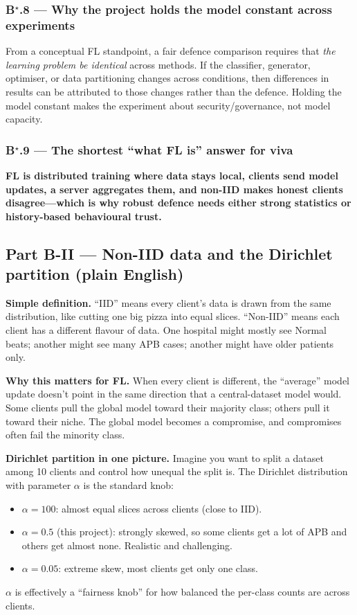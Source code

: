 \documentclass[11pt,a4paper]{article}
\begin{document}
\subsubsection{B$^\star$.8 --- Why the project holds the model constant across experiments}
From a conceptual FL standpoint, a fair defence comparison requires that
\emph{the learning problem be identical} across methods. If the classifier,
generator, optimiser, or data partitioning changes across conditions, then
differences in results can be attributed to those changes rather than the defence.
Holding the model constant makes the experiment about security/governance, not
model capacity.

\subsubsection{B$^\star$.9 --- The shortest ``what FL is'' answer for viva}
\textbf{FL is distributed training where data stays local, clients send model updates, a server aggregates them, and non-IID makes honest clients disagree---which is why robust defence needs either strong statistics or history-based behavioural trust.}

\subsection{Part B-II --- Non-IID data and the Dirichlet partition (plain English)}
\label{sec:noniid-dirichlet}

\textbf{Simple definition.} ``IID'' means every client's data is drawn from
the same distribution, like cutting one big pizza into equal slices. ``Non-IID''
means each client has a different flavour of data. One hospital might mostly see
Normal beats; another might see many APB cases; another might have older patients
only.

\textbf{Why this matters for FL.} When every client is different, the
``average'' model update doesn't point in the same direction that a central-dataset
model would. Some clients pull the global model toward their majority class;
others pull it toward their niche. The global model becomes a compromise, and
compromises often fail the minority class.

\textbf{Dirichlet partition in one picture.}
Imagine you want to split a dataset among 10 clients and control how unequal the
split is. The Dirichlet distribution with parameter $\alpha$ is the standard
knob:
\begin{itemize}
\item $\alpha = 100$: almost equal slices across clients (close to IID).
\item $\alpha = 0.5$ (this project): strongly skewed, so some clients get a lot
of APB and others get almost none. Realistic and challenging.
\item $\alpha = 0.05$: extreme skew, most clients get only one class.
\end{itemize}
$\alpha$ is effectively a ``fairness knob'' for how balanced the per-class counts
are across clients.
\end{document}
